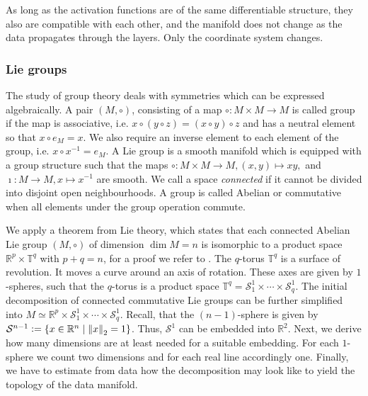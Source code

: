 \documentclass[runningheads,orivec]{llncs}
\begin{document}
As long as the activation functions are of the same differentiable structure, they also are compatible with each other, and the manifold does not change as the data propagates through the layers. Only the coordinate system changes.

\subsubsection{Lie groups} The study of group theory deals with symmetries which can be expressed algebraically. A pair $(M,\circ)$, consisting of a map $\circ: M\times M \rightarrow M$ is called group if the map is associative, i.e. $x \circ (y \circ z) = (x \circ y) \circ z$ and has a neutral element so that $x \circ e_{M} = x$. We also require an inverse element to each element of the group, i.e. $x \circ x^{-1} = e_{M}$. A Lie group is a smooth manifold which is equipped with a group structure such that the maps $\circ: M \times  M \rightarrow  M, (x,y) \mapsto xy, $ and $\imath: M \rightarrow  M, x \mapsto x^{-1}$ are smooth. We call a space \emph{connected} if it cannot be divided into disjoint open neighbourhoods. A group is called Abelian or commutative when all elements under the group operation commute.

We apply a theorem from Lie theory, which states that each connected Abelian Lie group $(M,\circ)$ of dimension $\dim M = n$ is isomorphic to a product space $\mathbb{R}^p \times \mathbb{T}^q$ with $p+q =n$, for a proof we refer to \cite[p.~116]{onishchik1993lie}. The $q$-torus $\mathbb{T}^q$ is a surface of revolution. It moves a curve around an axis of rotation. These axes are given by $1$-spheres, such that the $q$-torus is a product space $\mathbb{T}^q = \mathcal{S}^1_1 \times \cdots \times \mathcal{S}^1_q$. The initial decomposition of connected commutative Lie groups can be further simplified into $M \simeq \mathbb{R}^p \times \mathcal{S}^1_1 \times \cdots \times \mathcal{S}^1_q$. Recall, that the $(n-1)$-sphere is given by $\mathcal{S}^{n-1} := \{x \in \mathbb{R}^n \; \vert \; \norm{x}_2 = 1\}$. Thus, $\mathcal{S}^1$ can be embedded into $\mathbb{R}^2$. Next, we derive how many dimensions are at least needed for a suitable embedding. For each $1$-sphere we count two dimensions and for each real line accordingly one. Finally, we have to estimate from data how the decomposition may look like to yield the topology of the data manifold.
\end{document}
